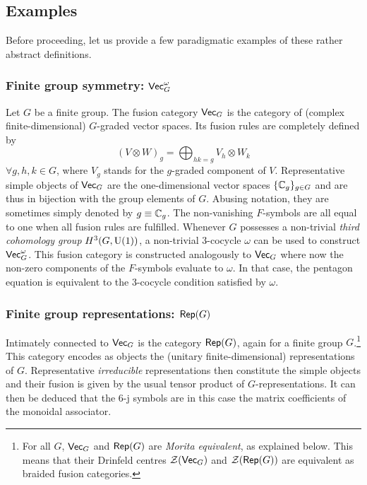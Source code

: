 \subsection{Examples}
Before proceeding, let us provide a few paradigmatic examples of these rather abstract definitions.
\subsubsection{Finite group symmetry: $\mathsf{Vec}_G^\omega$} Let $G$ be a finite group. The fusion category $\mathsf{Vec}_G$ is the category of (complex finite-dimensional) $G$-graded vector spaces. Its fusion rules are completely defined by
\begin{equation}
	(V\otimes W)_g = \bigoplus_{hk=g} V_h \otimes W_k
\end{equation}
$\forall g,h,k\in G$, where $V_g$ stands for the $g$-graded component of $V$. Representative simple objects of $\mathsf{Vec}_G$ are the one-dimensional vector spaces $\{\mathbb C_g\}_{g\in G}$ and are thus in bijection with the group elements of $G$. Abusing notation, they are sometimes simply denoted by $g\equiv\mathbb C_g$. The non-vanishing $F$-symbols are all equal to one when all fusion rules are fulfilled. Whenever $G$ possesses a non-trivial \emph{third cohomology group} $H^3(G,{\rm U}(1))$, a non-trivial 3-cocycle $\omega$ can be used to construct $\mathsf{Vec}_G^\omega$. This fusion category is constructed analogously to $\mathsf{Vec}_G$ where now the non-zero components of the $F$-symbols evaluate to $\omega$. In that case, the pentagon equation is equivalent to the 3-cocycle condition satisfied by $\omega$.
\subsubsection{Finite group representations: $\mathsf{Rep}(G)$} Intimately connected to $\mathsf{Vec}_G$ is the category $\mathsf{Rep}(G)$, again for a finite group $G$.\footnote{For all $G$, $\mathsf{Vec}_G$ and $\mathsf{Rep}(G)$ are \emph{Morita equivalent}, as explained below. This means that their Drinfeld centres $\mathcal{Z}(\mathsf{Vec}_G)$ and $\mathcal{Z}(\mathsf{Rep}(G))$ are equivalent as braided fusion categories.} This category encodes as objects the (unitary finite-dimensional) representations of $G$. Representative \emph{irreducible} representations then constitute the simple objects and their fusion is given by the usual tensor product of $G$-representations. It can then be deduced that the 6-j symbols are in this case the matrix coefficients of the monoidal associator.
